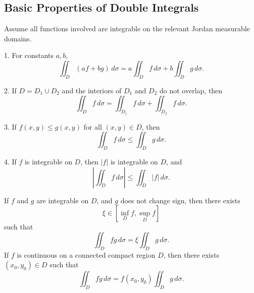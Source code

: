 \subsection{Basic Properties of Double Integrals}

Assume all functions involved are integrable on the relevant Jordan measurable domains.

\begin{property}[]
1. For constants $a,b$,
\[
    \iint_D (af+bg)\,d\sigma
    =a\iint_D f\,d\sigma+b\iint_D g\,d\sigma.
\]

2. If $D=D_1\cup D_2$ and the interiors of $D_1$ and $D_2$ do not overlap, then
\[
    \iint_D f\,d\sigma=\iint_{D_1} f\,d\sigma+\iint_{D_2} f\,d\sigma.
\]

3. If $f(x,y)\le g(x,y)$ for all $(x,y)\in D$, then
\[
    \iint_D f\,d\sigma\le \iint_D g\,d\sigma.
\]

4. If $f$ is integrable on $D$, then $|f|$ is integrable on $D$, and
\[
    \left|\iint_D f\,d\sigma\right|\le \iint_D |f|\,d\sigma.
\]
\end{property}

\newpage

\begin{theorem}
If $f$ and $g$ are integrable on $D$, and $g$ does not change sign, then there exists
\[
    \xi\in\left[\inf_D f,\sup_D f\right]
\]
such that
\[
    \iint_D fg\,d\sigma=\xi\iint_D g\,d\sigma.
\]
If $f$ is continuous on a connected compact region $D$, then there exists $(x_0,y_0)\in D$ such that
\[
    \iint_D fg\,d\sigma=f(x_0,y_0)\iint_D g\,d\sigma.
\]
\end{theorem}


